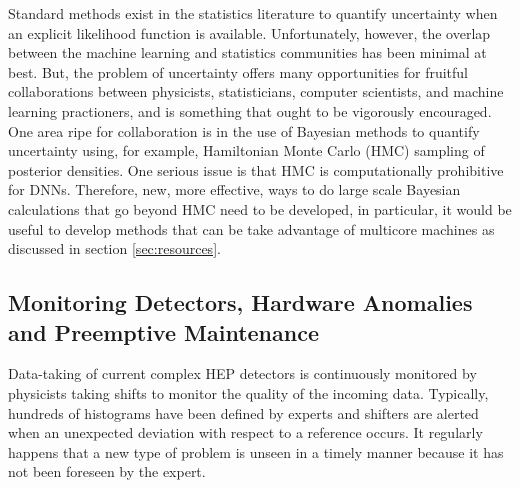 Standard methods exist in the statistics literature to quantify uncertainty when an explicit likelihood function is available. Unfortunately, however, the overlap between the machine learning and statistics communities has been minimal at best. But, the problem of uncertainty offers many opportunities for fruitful collaborations between physicists, statisticians, computer scientists, and machine learning practioners, and is something that ought to be vigorously encouraged.
One area ripe for collaboration is in the use of Bayesian methods to quantify uncertainty using, for example, Hamiltonian Monte Carlo (HMC) sampling of posterior densities. One serious issue is that HMC is computationally prohibitive for DNNs. Therefore, new, more effective, ways to do large scale Bayesian calculations that go beyond HMC need to be developed, in particular, it would be useful to develop methods that can be take advantage of multicore machines as discussed in section \ref{sec:resources}.






\subsection{Monitoring Detectors, Hardware Anomalies and Preemptive Maintenance}
\label{sec:applications-monitoring}
Data-taking of current complex HEP detectors is continuously monitored by physicists taking shifts to monitor the quality of the incoming data. Typically, hundreds of histograms have been defined by experts and shifters are alerted when an unexpected deviation with respect to a reference occurs. It regularly happens that a new type of problem is unseen in a timely manner because it has not been foreseen by the expert.

